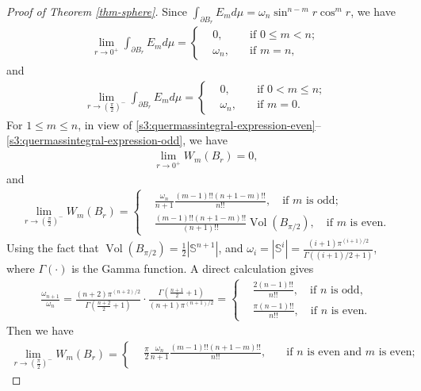 \documentclass[11pt,reqno]{amsart}
\theoremstyle{definition}
\theoremstyle{remark}
\numberwithin{equation}{section}
\renewcommand{\(}{\left(}
\renewcommand{\)}{\right)}
\renewcommand{\~}{\tilde}
\renewcommand{\-}{\overline}
\newcommand{\G}{\Gamma}
\newcommand{\ra}{\rightarrow}
\newcommand{\Vol}{\operatorname{Vol}}
\begin{document}
\begin{proof}[Proof of Theorem \ref{thm-sphere}]
	Since $\int_{\partial B_{r}} E_m d\mu=\omega_n \sin^{n-m}r \cos^m r$, we have 
	\begin{align*}
	\lim_{r\ra 0^+}\int_{\partial B_{r}} E_m d\mu=\left\{\begin{aligned}
	&0, \quad  &\text{if $0\leq m<n$};\\
	&\omega_n, \quad &\text{if $m=n$},
	\end{aligned}\right.
	\end{align*}
	and
	\begin{align*}
	\lim_{r\ra (\frac{\pi}{2})^-}\int_{\partial B_{r}} E_m d\mu=\left\{\begin{aligned}
	&0, \quad  &\text{if $0<m\leq n$};\\
	&\omega_n, \quad &\text{if $m=0$}.
	\end{aligned}\right.
	\end{align*}
	For $1\leq m\leq n$, in view of \eqref{s3:quermassintegral-expression-even}-- \eqref{s3:quermassintegral-expression-odd}, we have
	\begin{align*}
	\lim_{r\ra 0^+}W_m(B_r)=0, 
	\end{align*}
	and
	\begin{align*}
	\lim_{r\ra (\frac{\pi}{2})^-}W_m(B_r)=\left\{\begin{aligned} 
	&\frac{\omega_n}{n+1}\frac{(m-1)!!(n+1-m)!!}{n!!},  \quad \text{if $m$ is odd};\\
	&\frac{(m-1)!!(n+1-m)!!}{(n+1)!!}\Vol(B_{\pi/2}),  \quad \text{if $m$ is even}.
	\end{aligned}  \right.
	\end{align*}
	Using the fact that $\Vol(B_{\pi/2})=\frac{1}{2}|\mathbb S^{n+1}|$, and $\omega_i=|\mathbb S^i|=\frac{(i+1)\pi^{(i+1)/2}}{\G((i+1)/2+1)}$, where $\G(\cdot)$ is the Gamma function. A direct calculation gives
	\begin{align*}
	\frac{\omega_{n+1}}{\omega_n}=\frac{(n+2)\pi^{(n+2)/2}}{\G(\frac{n+2}{2}+1)} \cdot \frac{\G(\frac{n+1}{2}+1)}{(n+1)\pi^{(n+1)/2}} = \left\{ \begin{aligned}
	&\frac{2(n-1)!!}{n!!}, \quad   \text{if $n$ is odd},\\
	&\frac{\pi(n-1)!!}{n!!}, \quad   \text{if $n$ is even}.
	\end{aligned}\right.
	\end{align*}
	Then we have
	\begin{align*}
	\lim_{r\ra (\frac{\pi}{2})^-}W_m(B_r)=\left\{\begin{aligned} 
	&\frac{\pi}{2}\frac{\omega_n}{n+1} \frac{(m-1)!!(n+1-m)!!}{n!!},  \quad &\text{if $n$ is even and $m$ is even};\\

\end{aligned}
\end{align*}
\end{proof}
\end{document}
